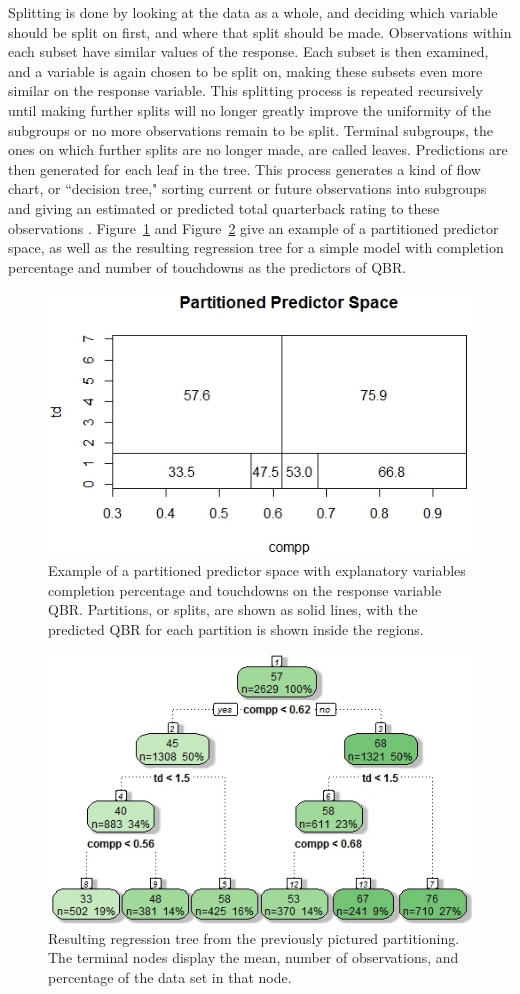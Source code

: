 \documentclass[12pt]{article}\usepackage[]{graphicx}\usepackage[]{color}
\begin{document}
Splitting is done by looking at the data as a whole, and deciding which variable should be split on first, and where that split should be made. Observations within each subset have similar values of the response. Each subset is then examined, and a variable is again chosen to be split on, making these subsets even more similar on the response variable. This splitting process is repeated recursively until making further splits will no longer greatly improve the uniformity of the subgroups or no more observations remain to be split. Terminal subgroups, the ones on which further splits are no longer made, are called leaves. Predictions are then generated for each leaf in the tree. This process generates a kind of flow chart, or ``decision tree," sorting current or future observations into subgroups and giving an estimated or predicted total quarterback rating to these observations \cite{gam}. Figure~\ref{fig:part} and Figure~\ref{fig:ex} give an example of a partitioned predictor space, as well as the resulting regression tree for a simple model with completion percentage and number of touchdowns as the predictors of QBR.
\newpage

\begin{figure}[h]
\centering
\includegraphics[width=.6\textwidth]{expartspace.jpeg}
\captionsetup{font=footnotesize,labelfont=footnotesize}
\caption{\label{fig:part} Example of a partitioned predictor space with explanatory variables completion percentage and touchdowns on the response variable QBR. Partitions, or splits, are shown as solid lines, with the predicted QBR for each partition is shown inside the regions.}
\end{figure}

\begin{figure}[h]
\centering
\includegraphics[width=.6\textwidth]{extree.jpeg}
\captionsetup{font=footnotesize,labelfont=footnotesize}
\caption{\label{fig:ex} Resulting regression tree from the previously pictured partitioning. The terminal nodes display the mean, number of observations, and percentage of the data set in that node.}
\end{figure}
\end{document}

